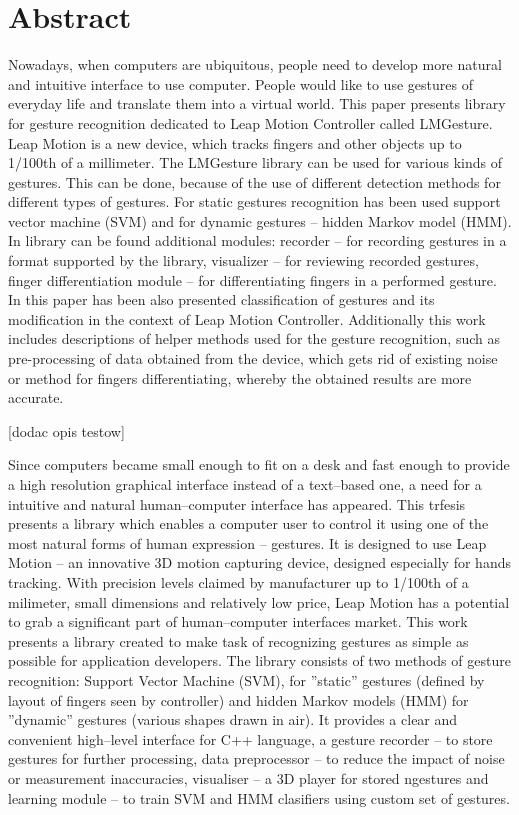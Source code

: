 
\chapter{Abstract}
Nowadays, when computers are ubiquitous, people need to develop more natural and intuitive interface to use computer. People would like to use gestures of everyday life and translate them into a virtual world. This paper presents library for gesture recognition dedicated to Leap Motion Controller called LMGesture.  Leap Motion is a new device, which tracks fingers and other objects up to 1/100th of a millimeter. The LMGesture library can be used for various kinds of gestures. This can be done, because of the use of different detection methods for different types of gestures. For static gestures recognition has been used support vector machine (SVM) and for dynamic gestures -- hidden Markov model (HMM). In library can be found additional modules: recorder -- for recording gestures in a format supported by the library, visualizer -- for reviewing recorded gestures, finger differentiation module -- for differentiating fingers in a performed gesture.  In this paper has been also presented classification of gestures and its modification in the context of Leap Motion Controller. Additionally this work includes descriptions of helper methods used for the gesture recognition, such as pre-processing of data obtained from the device, which gets rid of existing noise or method for fingers differentiating, whereby the obtained results are more accurate.

{\color{red} [dodac opis testow]}



Since computers became small enough to fit on a desk and fast enough to provide a high resolution graphical interface instead of a text--based one, a need for a intuitive and natural human--computer interface has appeared. This trfesis presents a library which enables a computer user to control it using one of the most natural forms of human expression -- gestures. It is designed to use Leap Motion -- an innovative 3D motion capturing device, designed especially for hands tracking. With precision levels claimed by manufacturer up to 1/100th of a milimeter, small dimensions and relatively low price, Leap Motion has a potential to grab a significant part of human--computer interfaces market. This work presents a library created to make task of recognizing gestures as simple as possible for application developers. The library consists of two methods of gesture recognition: Support Vector Machine (SVM), for ''static'' gestures (defined by layout of fingers seen by controller) and hidden Markov models (HMM) for ''dynamic'' gestures (various shapes drawn in air). It provides a clear and convenient high--level interface for C++ language, a gesture recorder -- to store gestures for further processing, data preprocessor -- to reduce the impact of noise or measurement inaccuracies, visualiser -- a 3D player for stored ngestures and learning module -- to train SVM and HMM clasifiers using custom set of gestures.